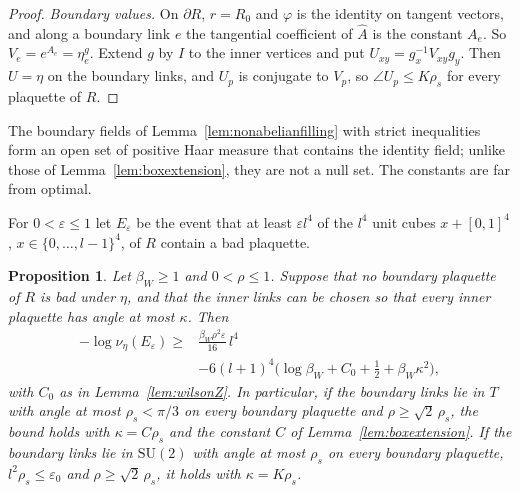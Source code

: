\documentclass[11pt]{amsart}
\newtheorem{proposition}[theorem]{Proposition}
\theoremstyle{definition}
\theoremstyle{remark}
\numberwithin{equation}{section}
\newcommand{\SU}{\mathrm{SU}}
\begin{document}
\begin{proof}
\emph{Boundary values.} On $\partial R$, $r=R_0$ and $\varphi$ is the
identity on tangent vectors, and along a boundary link $e$ the tangential
coefficient of $\hat A$ is the constant $A_e$. So $V_e=e^{A_e}=\eta^g_e$.
Extend $g$ by $I$ to the inner vertices and put $U_{xy}=g_x^{-1}V_{xy}g_y$.
Then $U=\eta$ on the boundary links, and $U_p$ is conjugate to $V_p$, so
$\angle U_p\le K\rho_s$ for every plaquette of $R$.
\end{proof}

The boundary fields of Lemma~\ref{lem:nonabelianfilling} with strict
inequalities form an open set of positive Haar measure that contains the
identity field; unlike those of Lemma~\ref{lem:boxextension}, they are not
a null set. The constants are far from optimal.

For $0<\varepsilon\le1$ let $E_\varepsilon$ be the event that at least
$\varepsilon l^4$ of the $l^4$ unit cubes $x+[0,1]^4$, $x\in\{0,\dots,
l-1\}^4$, of $R$ contain a bad plaquette.

\begin{proposition}\label{prop:conddensity}
Let $\beta_W\ge1$ and $0<\rho\le1$. Suppose that no boundary plaquette of
$R$ is bad under $\eta$, and that the inner links can be chosen so that
every inner plaquette has angle at most $\kappa$. Then
\[
\begin{split}
-\log\nu_\eta(E_\varepsilon)\ge{}&\frac{\beta_W\rho^2\varepsilon}{16}\,l^4\\
&-6(l+1)^4\bigl(\log\beta_W+C_0+\tfrac12+\beta_W\kappa^2\bigr),
\end{split}
\]
with $C_0$ as in Lemma~\ref{lem:wilsonZ}. In particular, if the boundary
links lie in $T$ with angle at most $\rho_s<\pi/3$ on every boundary
plaquette and $\rho\ge\sqrt2\,\rho_s$, the bound holds with $\kappa=C\rho_s$
and the constant $C$ of Lemma~\ref{lem:boxextension}. If the boundary
links lie in $\SU(2)$ with angle at most $\rho_s$ on every boundary
plaquette, $l^2\rho_s\le\varepsilon_0$ and $\rho\ge\sqrt2\,\rho_s$, it
holds with $\kappa=K\rho_s$.
\end{proposition}
\end{document}

